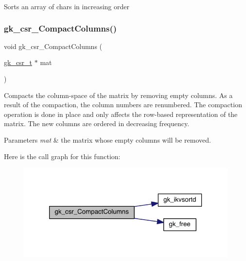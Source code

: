Sorts an array of chars in increasing order \mbox{\label{a00077_a3e15963be76870160707368a5fe7f693}} 
\subsubsection{\texorpdfstring{gk\+\_\+csr\+\_\+\+Compact\+Columns()}{gk\_csr\_CompactColumns()}}
{\footnotesize\ttfamily void gk\+\_\+csr\+\_\+\+Compact\+Columns (\begin{DoxyParamCaption}\item[{\hyperlink{a00634}{gk\+\_\+csr\+\_\+t} $\ast$}]{mat }\end{DoxyParamCaption})}

Compacts the column-\/space of the matrix by removing empty columns. As a result of the compaction, the column numbers are renumbered. The compaction operation is done in place and only affects the row-\/based representation of the matrix. The new columns are ordered in decreasing frequency.


\begin{DoxyParams}{Parameters}
{\em mat} & the matrix whose empty columns will be removed. \\
\hline
\end{DoxyParams}
Here is the call graph for this function\+:\nopagebreak
\begin{figure}[H]
\begin{center}
\leavevmode
\includegraphics[width=316pt]{a00077_a3e15963be76870160707368a5fe7f693_cgraph}
\end{center}
\end{figure}
\mbox{\label{a00077_a86d96bf7b4f265b0e4a3b244ba031b0d}} 
